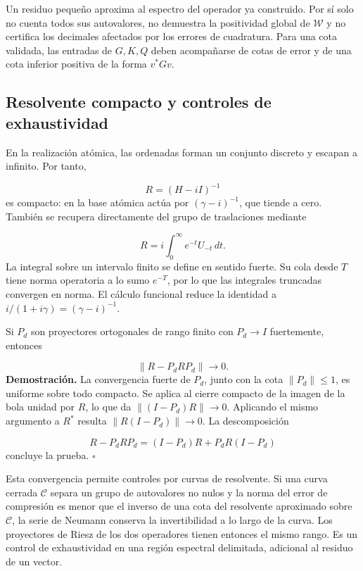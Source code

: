 Un residuo pequeño aproxima al espectro del operador ya construido. Por sí solo no cuenta todos sus autovalores, no demuestra la positividad global de \(\mathscr W\) y no certifica los decimales afectados por los errores de cuadratura. Para una cota validada, las entradas de \(G,K,Q\) deben acompañarse de cotas de error y de una cota inferior positiva de la forma \(v^*Gv\).

\subsection{Resolvente compacto y controles de exhaustividad}
\label{viii:rz:resolvente}
En la realización atómica, las ordenadas forman un conjunto discreto y escapan a infinito. Por tanto,

\[
R=(H-iI)^{-1}
\]
es compacto: en la base atómica actúa por \((\gamma-i)^{-1}\), que tiende a cero. También se recupera directamente del grupo de traslaciones mediante

\[
R=i\int_0^\infty e^{-t}U_{-t}\,dt.
\]
La integral sobre un intervalo finito se define en sentido fuerte. Su cola desde \(T\) tiene norma operatoria a lo sumo \(e^{-T}\), por lo que las integrales truncadas convergen en norma. El cálculo funcional reduce la identidad a \(i/(1+i\gamma)=(\gamma-i)^{-1}\).

Si \(P_d\) son proyectores ortogonales de rango finito con \(P_d\to I\) fuertemente, entonces

\[
\|R-P_dRP_d\|\longrightarrow0.
\]
\textbf{Demostración.} La convergencia fuerte de \(P_d\), junto con la cota \(\|P_d\|\leq1\), es uniforme sobre todo compacto. Se aplica al cierre compacto de la imagen de la bola unidad por \(R\), lo que da \(\|(I-P_d)R\|\to0\). Aplicando el mismo argumento a \(R^*\) resulta \(\|R(I-P_d)\|\to0\). La descomposición

\[
R-P_dRP_d=(I-P_d)R+P_dR(I-P_d)
\]
concluye la prueba. \hfill\(\square\)

Esta convergencia permite controles por curvas de resolvente. Si una curva cerrada \(\mathcal C\) separa un grupo de autovalores no nulos y la norma del error de compresión es menor que el inverso de una cota del resolvente aproximado sobre \(\mathcal C\), la serie de Neumann conserva la invertibilidad a lo largo de la curva. Los proyectores de Riesz de los dos operadores tienen entonces el mismo rango. Es un control de exhaustividad en una región espectral delimitada, adicional al residuo de un vector.

